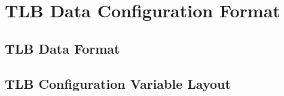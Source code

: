 \chapter{TLB Data Configuration Format}
\label{TLBDataFormat}

\section{TLB Data Format}


\section{TLB Configuration Variable Layout}
